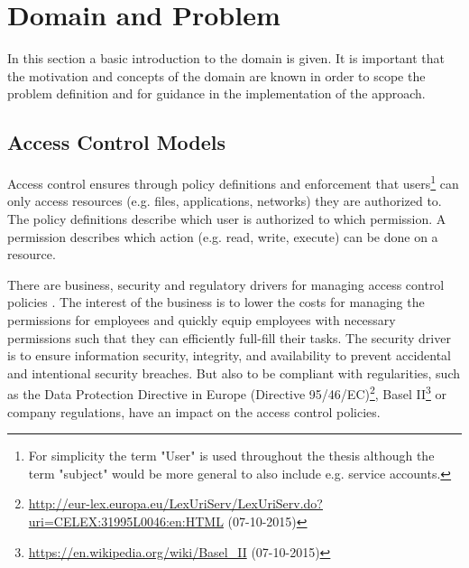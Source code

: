 \newpage
\chapter{Domain and Problem}
\label{sec:domain}
In this section a basic introduction to the domain is given. It is important that the motivation and concepts of the domain are known in order to scope the problem definition and for guidance in the implementation of the approach.

    \section{Access Control Models}
    Access control ensures through policy definitions and enforcement that users\footnote{For simplicity the term "User" is used throughout the thesis although the term "subject" would be more general to also include e.g. service accounts.} can only access resources (e.g. files, applications, networks) they are authorized to. The policy definitions describe which user is authorized to which permission. A permission describes which action (e.g. read, write, execute) can be done on a resource.
    
    There are business, security and regulatory drivers for managing access control policies \cite{o20102010}. The interest of the business is to lower the costs for managing the permissions for employees and quickly equip employees with necessary permissions such that they can efficiently full-fill their tasks. The security driver is to ensure information security, integrity, and availability to prevent accidental and intentional security breaches. But also to be compliant with regularities, such as the Data Protection Directive in Europe (Directive 95/46/EC)\footnote{\url{http://eur-lex.europa.eu/LexUriServ/LexUriServ.do?uri=CELEX:31995L0046:en:HTML} (07-10-2015)}, Basel II\footnote{\url{https://en.wikipedia.org/wiki/Basel_II} (07-10-2015)} or company regulations, have an impact on the access control policies.
    
